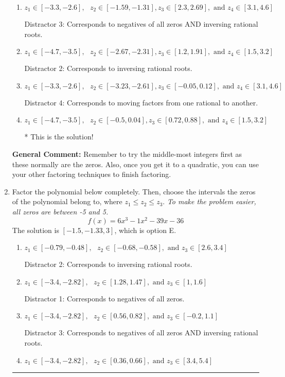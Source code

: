 \documentclass{extbook}[14pt]
\newcommand{\litem}[1]{\item #1

\rule{\textwidth}{0.4pt}}
\begin{document}
\begin{enumerate}
{\begin{enumerate}[label=\Alph*.]
 Distractor 1: Corresponds to negatives of all zeros.
\item \( z_1 \in [-3.3, -2.6], \text{   }  z_2 \in [-1.59, -1.31], z_3 \in [2.3, 2.69], \text{   and   } z_4 \in [3.1, 4.6] \)

 Distractor 3: Corresponds to negatives of all zeros AND inversing rational roots.
\item \( z_1 \in [-4.7, -3.5], \text{   }  z_2 \in [-2.67, -2.31], z_3 \in [1.2, 1.91], \text{   and   } z_4 \in [1.5, 3.2] \)

 Distractor 2: Corresponds to inversing rational roots.
\item \( z_1 \in [-3.3, -2.6], \text{   }  z_2 \in [-3.23, -2.61], z_3 \in [-0.05, 0.12], \text{   and   } z_4 \in [3.1, 4.6] \)

 Distractor 4: Corresponds to moving factors from one rational to another.
\item \( z_1 \in [-4.7, -3.5], \text{   }  z_2 \in [-0.5, 0.04], z_3 \in [0.72, 0.88], \text{   and   } z_4 \in [1.5, 3.2] \)

* This is the solution!
\end{enumerate}

\textbf{General Comment:} Remember to try the middle-most integers first as these normally are the zeros. Also, once you get it to a quadratic, you can use your other factoring techniques to finish factoring.
}
\litem{
Factor the polynomial below completely. Then, choose the intervals the zeros of the polynomial belong to, where $z_1 \leq z_2 \leq z_3$. \textit{To make the problem easier, all zeros are between -5 and 5.}
\[ f(x) = 6x^{3} -1 x^{2} -39 x -36 \]The solution is \( [-1.5, -1.33, 3] \), which is option E.\begin{enumerate}[label=\Alph*.]
\item \( z_1 \in [-0.79, -0.48], \text{   }  z_2 \in [-0.68, -0.58], \text{   and   } z_3 \in [2.6, 3.4] \)

 Distractor 2: Corresponds to inversing rational roots.
\item \( z_1 \in [-3.4, -2.82], \text{   }  z_2 \in [1.28, 1.47], \text{   and   } z_3 \in [1, 1.6] \)

 Distractor 1: Corresponds to negatives of all zeros.
\item \( z_1 \in [-3.4, -2.82], \text{   }  z_2 \in [0.56, 0.82], \text{   and   } z_3 \in [-0.2, 1.1] \)

 Distractor 3: Corresponds to negatives of all zeros AND inversing rational roots.
\item \( z_1 \in [-3.4, -2.82], \text{   }  z_2 \in [0.36, 0.66], \text{   and   } z_3 \in [3.4, 5.4] \)


\end{enumerate}}
\end{enumerate}
\end{document}
